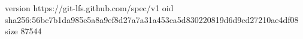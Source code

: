 version https://git-lfs.github.com/spec/v1
oid sha256:56bc7b1da985e5a8a9ef8d27a7a31a453ca5d830220819d6d9cd27210ae4df08
size 87544

